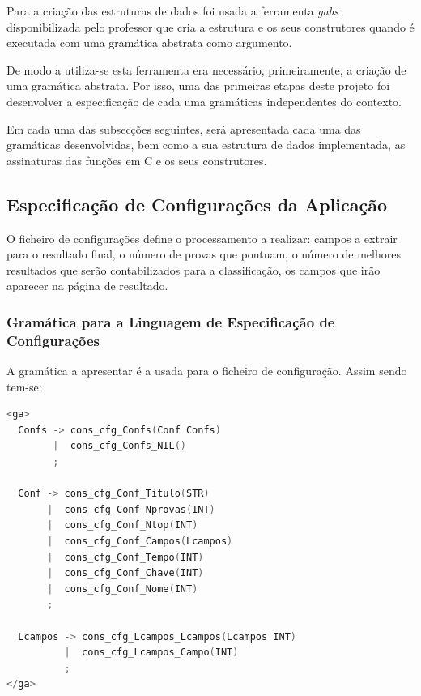 \documentclass[11pt, a4paper, oneside]{article}
\begin{document}
Para a criação das estruturas de dados foi usada a ferramenta \textit{gabs} disponibilizada pelo professor que cria a estrutura e os seus construtores quando é executada com uma gramática abstrata como argumento.

De modo a utiliza-se esta ferramenta era necessário, primeiramente, a criação de uma gramática abstrata. Por isso, uma das primeiras etapas deste projeto foi desenvolver a especificação de cada uma gramáticas independentes do contexto. 

Em cada uma das subsecções seguintes, será apresentada cada uma das gramáticas desenvolvidas, bem como a sua estrutura de dados implementada, as assinaturas das funções em C e os seus construtores.

\subsection{Especificação de Configurações da Aplicação}
O ficheiro de configurações define o processamento a realizar: campos a extrair para o resultado final, o número de provas que pontuam, o número de melhores resultados que serão contabilizados para a classificação, os campos que irão aparecer na página de resultado.


\subsubsection{Gramática para a Linguagem de Especificação de Configurações}

A gramática a apresentar é a usada para o ficheiro de configuração. Assim sendo tem-se:
\begin{lstlisting}[language=C, caption={Gramática para a linguagem de especificação de configurações.}]
<ga>
  Confs -> cons_cfg_Confs(Conf Confs)
        |  cons_cfg_Confs_NIL()
        ;

  Conf -> cons_cfg_Conf_Titulo(STR)
       |  cons_cfg_Conf_Nprovas(INT)
       |  cons_cfg_Conf_Ntop(INT)
       |  cons_cfg_Conf_Campos(Lcampos)
       |  cons_cfg_Conf_Tempo(INT)
       |  cons_cfg_Conf_Chave(INT)
       |  cons_cfg_Conf_Nome(INT)
       ;

  Lcampos -> cons_cfg_Lcampos_Lcampos(Lcampos INT)
          |  cons_cfg_Lcampos_Campo(INT)
          ;
</ga>
\end{lstlisting}

\newpage
\end{document}
